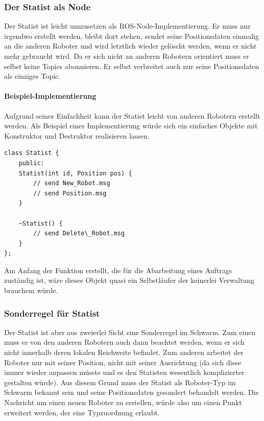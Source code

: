 \subsubsection*{Der Statist als Node}

Der Statist ist leicht umzusetzen als \ac{ROS}-Node-Implementierung. Er muss nur irgendwo erstellt werden, bleibt dort stehen, sendet seine Positionsdaten einmalig an die anderen Roboter und wird letztlich wieder gelöscht werden, wenn er nicht mehr gebraucht wird. Da er sich nicht an anderen Robotern orientiert muss er selbst keine Topics abonnieren. Er selbst verbreitet auch nur seine Positionsdaten als einziges Topic. 

\paragraph*{Beispiel-Implementierung}
Aufgrund seiner Einfachheit kann der Statist leicht von anderen Robotern erstellt werden. Als Beispiel einer Implementierung würde sich ein einfaches Objekte mit Konstruktor und Destruktor realisieren lassen.

\begin{lstlisting}[style=cpp]
class Statist {
	public:
	Statist(int id, Position pos) {
		// send New_Robot.msg
		// send Position.msg
	}
	
	~Statist() {
		// send Delete\_Robot.msg
	}
};
\end{lstlisting}

Am Anfang der Funktion erstellt, die für die Abarbeitung eines Auftrags zuständig ist, wäre dieses Objekt quasi ein Selbstläufer der keinerlei Verwaltung brauchem würde.

\subsubsection*{Sonderregel für Statist}

Der Statist ist aber aus zweierlei Sicht eine Sonderregel im Schwarm. Zum einen muss er von den anderen Robotern auch dann beachtet werden, wenn er sich nicht innerhalb deren lokalen Reichweite befindet. Zum anderen arbeitet der Roboter nur mit seiner Position, nicht mit seiner Ausrichtung (da sich diese immer wieder anpassen müsste und es den Statisten wesentlich komplizierter gestalten würde). Aus diesem Grund muss der Statist als Roboter-Typ im Schwarm bekannt sein und seine Positionsdaten gesondert behandelt werden. Die Nachricht um einen neuen Roboter zu erstellen, würde also um einen Punkt erweitert werden, der eine Typzuordnung erlaubt.

